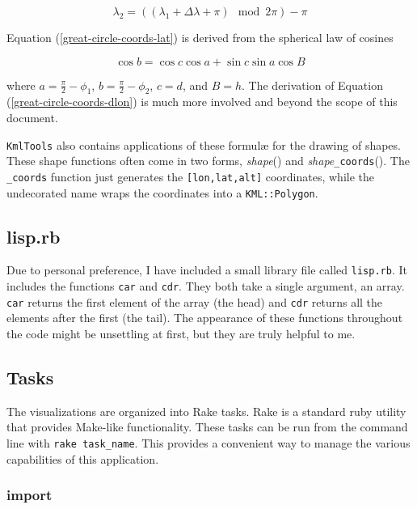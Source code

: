\documentclass[12pt]{article}
\begin{document}
\begin{equation}
\lambda_2 = \left((\lambda_1+\Delta\lambda+\pi) \mod 2\pi\right)-\pi
\end{equation}

Equation (\ref{great-circle-coords-lat}) is derived from the spherical law of cosines

\begin{equation}
\cos{b} =\cos{c}\cos{a} + \sin c\sin a\cos B
\end{equation}

where $a=\frac{\pi}{2}-\phi_1$, $b=\frac{\pi}{2}-\phi_2$, $c=d$, and $B=h$.  The derivation of Equation (\ref{great-circle-coords-dlon}) is much more involved and beyond the scope of this document.

\texttt{KmlTools} also contains applications of these formul\ae{} for the drawing of shapes.  These shape functions often come in two forms, \textit{shape}() and \textit{shape}\texttt{\_coords}().  The \texttt{\_coords} function just generates the \texttt{[lon,lat,alt]} coordinates, while the undecorated name wraps the coordinates into a \texttt{KML::Polygon}.

\subsection*{lisp.rb}

Due to personal preference, I have included a small library file called \texttt{lisp.rb}.  It includes the functions \texttt{car} and \texttt{cdr}.  They both take a single argument, an array.  \texttt{car} returns the first element of the array (the head) and \texttt{cdr} returns all the elements after the first (the tail).  The appearance of these functions throughout the code might be unsettling at first, but they are truly helpful to me.

\subsection*{Tasks}

The visualizations are organized into Rake tasks.  Rake is a standard ruby utility that provides Make-like functionality.  These tasks can be run from the command line with \texttt{rake task\_name}.  This provides a convenient way to manage the various capabilities of this application.

\subsubsection*{import}
\end{document}
